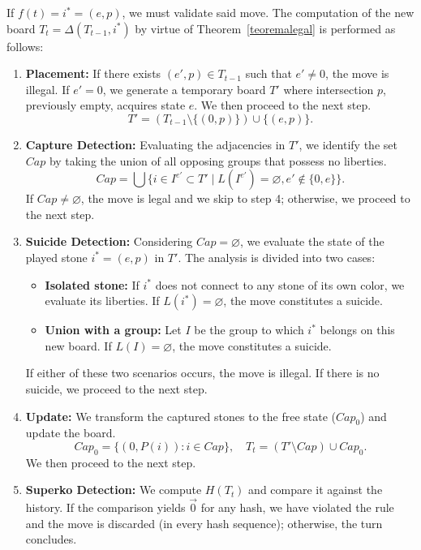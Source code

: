 If $f(t) = i^{*} = (e, p)$, we must validate said move. The computation of the new board $T_t = \Delta(T_{t-1}, i^{*})$ by virtue of Theorem~\ref{teoremalegal} is performed as follows:
\begin{enumerate}
	\item \textbf{Placement:} If there exists $(e',p)\in T_{t-1}$ such that $e' \neq 0$, the move is illegal. If $e'=0$, we generate a temporary board $T'$ where intersection $p$, previously empty, acquires state $e$. We then proceed to the next step.
	$$T' = \left(T_{t-1} \setminus \{(0, p)\}\right) \cup \{(e, p)\}.$$
	
	\item \textbf{Capture Detection:} Evaluating the adjacencies in $T'$, we identify the set $Cap$ by taking the union of all opposing groups that possess no liberties.$$Cap = \bigcup \{ i\in I^{e'} \subset T' \mid L(I^{e'}) = \varnothing, e' \notin \{0, e\}\}.$$If $Cap \neq \varnothing$, the move is legal and we skip to step 4; otherwise, we proceed to the next step.
	
	\item \textbf{Suicide Detection:} Considering $Cap = \varnothing$, we evaluate the state of the played stone $i^* = (e, p)$ in $T'$. The analysis is divided into two cases:
	\begin{itemize}
		\item \textbf{Isolated stone:} If $i^*$ does not connect to any stone of its own color, we evaluate its liberties. If $L(i^*) = \varnothing$, the move constitutes a suicide.
		\item \textbf{Union with a group:} Let $I$ be the group to which $i^*$ belongs on this new board. If $L(I) = \varnothing$, the move constitutes a suicide.
	\end{itemize}
	If either of these two scenarios occurs, the move is illegal. If there is no suicide, we proceed to the next step.
	
	\item \textbf{Update:} We transform the captured stones to the free state ($Cap_0$) and update the board.$$Cap_0 = \{(0, P(i)) : i \in Cap\},\quad T_t = (T' \setminus Cap) \cup Cap_0.$$
	We then proceed to the next step.
	
	\item \textbf{Superko Detection:}
	We compute \(H(T_t)\) and compare it against the history. If the comparison yields \(\vec{0}\) for any hash, we have violated the rule and the move is discarded (in every hash sequence); otherwise, the turn concludes.
	\end{enumerate}
	
